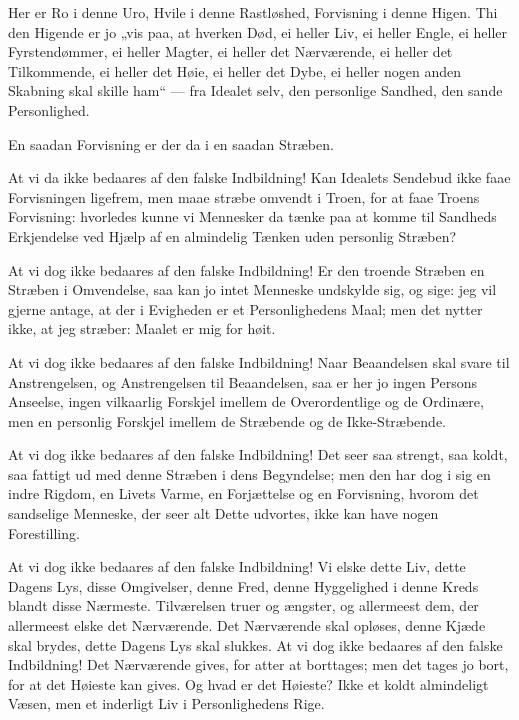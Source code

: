 \documentclass[12pt,a4paper]{book}
\newcommand{\apage}[1]{\marginnote{\footnotesize\textit{[#1]}}}
\begin{document}
Her er Ro i denne Uro, Hvile i denne Rastløshed, Forvisning i
denne Higen. Thi den Higende er jo „vis paa, at hverken Død, ei
heller Liv, ei heller Engle, ei heller Fyrstendømmer, ei heller
Magter, ei heller det Nærværende, ei heller det Tilkommende, ei
heller det Høie, ei heller det Dybe, ei heller nogen anden Skabning
skal skille ham“ --- fra Idealet selv, den personlige Sandhed, den
sande Personlighed.

En saadan Forvisning er der da i en saadan Stræben.

At vi da ikke bedaares af den falske Indbildning! Kan Idealets
Sendebud ikke faae Forvisningen ligefrem, men maae stræbe
omvendt i Troen, for at faae Troens Forvisning: hvorledes kunne vi
Mennesker da tænke paa at komme til Sandheds Erkjendelse ved
Hjælp af en almindelig Tænken uden personlig Stræben?

At vi dog ikke bedaares af den falske Indbildning! Er den troende
Stræben en Stræben i Omvendelse, saa kan jo intet Menneske
undskylde sig, og sige: jeg vil gjerne antage, at der i Evigheden er
et Personlighedens Maal; men det nytter ikke, at jeg stræber:
Maalet er mig for høit.

At vi dog ikke bedaares af den falske Indbildning! Naar
Beaandelsen skal svare til Anstrengelsen, og Anstrengelsen til
Beaandelsen, saa er her jo ingen Persons Anseelse, ingen vilkaarlig
Forskjel imellem de Overordentlige og de Ordinære, men en
personlig Forskjel imellem de Stræbende og de Ikke-Stræbende.

At vi dog ikke bedaares af den falske Indbildning! Det seer saa
strengt, saa koldt, saa fattigt ud med denne Stræben
i \apage{143} dens Begyndelse; men den har dog i sig en indre Rigdom, en Livets
Varme, en Forjættelse og en Forvisning, hvorom det sandselige
Menneske, der seer alt Dette udvortes, ikke kan have nogen
Forestilling.

At vi dog ikke bedaares af den falske Indbildning! Vi elske dette
Liv, dette Dagens Lys, disse Omgivelser, denne Fred, denne
Hyggelighed i denne Kreds blandt disse Nærmeste. Tilværelsen
truer og ængster, og allermeest dem, der allermeest elske det
Nærværende. Det Nærværende skal opløses, denne Kjæde skal
brydes, dette Dagens Lys skal slukkes. At vi dog ikke bedaares af
den falske Indbildning! Det Nærværende gives, for atter at
borttages; men det tages jo bort, for at det Høieste kan gives. Og
hvad er det Høieste? Ikke et koldt almindeligt Væsen, men et
inderligt Liv i Personlighedens Rige.
\end{document}
